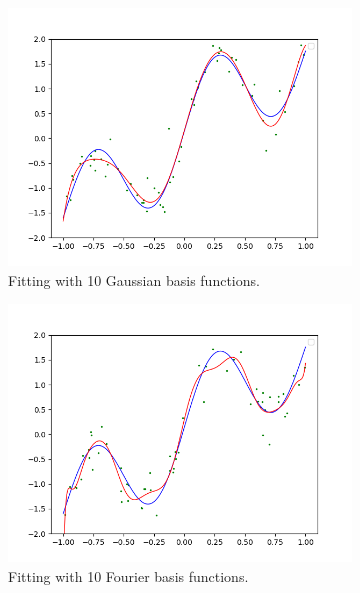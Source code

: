 \documentclass{article}
\begin{document}
      \begin{figure}[H]
          \centering
          \begin{subfigure}[b]{0.48\textwidth}
          \centering
              \includegraphics[width=\textwidth]{img/Gaussian_Fit.png}
              \caption{Fitting with 10 Gaussian basis functions. }
              \label{fig:gaussian_basis}
          \end{subfigure}
          \hfill 
          \begin{subfigure}[b]{0.48\textwidth}
          \centering
              \includegraphics[width=\textwidth]{img/Fourier_Fit.png}
              \caption{Fitting with 10 Fourier basis functions. }
              \label{fig:fourier_basis}
          \end{subfigure}
          \caption{}
          \label{Coincide_mean}
      \end{figure}
\end{document}
